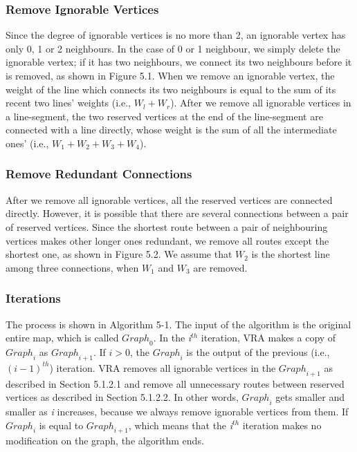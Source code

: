 \subsubsection{ Remove Ignorable Vertices}

\noindent Since the degree of ignorable vertices is no more than 2, an ignorable vertex has only 0, 1 or 2 neighbours. In the case of 0 or 1 neighbour, we simply delete the ignorable vertex; if it has two neighbours, we connect its two neighbours before it is removed, as shown in Figure 5.1. When we remove an ignorable vertex, the weight of the line which connects its two neighbours is equal to the sum of its recent two lines' weights (i.e., $W_l+W_r$). After we remove all ignorable vertices in a line-segment, the two reserved vertices at the end of the line-segment are connected with a line directly, whose weight is the sum of all the intermediate ones' (i.e., $W_1+W_2+W_3+W_4$).


\subsubsection{ Remove Redundant Connections}

\noindent After we remove all ignorable vertices, all the reserved vertices are connected directly. However, it is possible that there are several connections between a pair of reserved vertices. Since the shortest route between a pair of neighbouring vertices makes other longer ones redundant, we remove all routes except the shortest one, as shown in Figure 5.2. We assume that $W_2$ is the shortest line among three connections, when $W_1$ and $W_3$ are removed.


\subsubsection{ Iterations}

The process is shown in Algorithm 5-1. The input of the algorithm is the original entire map, which is called ${Graph}_0$. In the \textit{i}${}^{th}$ iteration, VRA makes a copy of ${Graph}_i$ as ${Graph}_{i+1}$. If $i>0$, the ${Graph}_i$ is the output of the previous (i.e., ${\left(i-1\right)}^{th}$) iteration. VRA removes all ignorable vertices in the ${Graph}_{i+1}$ as described in Section 5.1.2.1 and remove all unnecessary routes between reserved vertices as described in Section 5.1.2.2. In other words, ${Graph}_i$ gets smaller and smaller as \textit{i} increases, because we always remove ignorable vertices from them. If ${Graph}_i$ is equal to ${Graph}_{i+1}$, which means that the \textit{i}${}^{th}$ iteration makes no modification on the graph, the algorithm ends.


